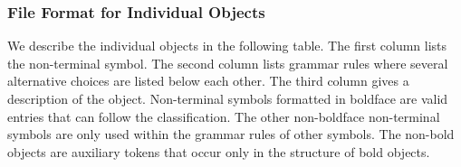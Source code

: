 \subsubsection{File Format for Individual Objects}
\label{grammar}

We describe the individual objects in the following table. The first
column lists the non-terminal symbol. The second column lists grammar
rules where several alternative choices are listed below each other.
The third column gives a description of the object.  Non-terminal
symbols formatted in boldface are valid  entries that can
follow the classification. The other non-boldface non-terminal symbols
are only used within the grammar rules of other symbols.  The non-bold
objects are auxiliary tokens that occur only in the structure of bold
objects. \medskip

